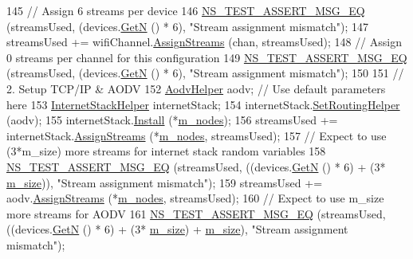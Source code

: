 \begin{DoxyCode}
145   \textcolor{comment}{// Assign 6 streams per device}
146   \hyperlink{group__testing_ga2a9d78cffb3db8e867c35fff0b698cf5}{NS\_TEST\_ASSERT\_MSG\_EQ} (streamsUsed, (devices.\hyperlink{classns3_1_1NetDeviceContainer_a74cafc212479bc38976bebd118e856b9}{GetN} () * 6), \textcolor{stringliteral}{"Stream assignment
       mismatch"});
147   streamsUsed += wifiChannel.\hyperlink{classns3_1_1YansWifiChannelHelper_ab409a15cfb8abb5195177625191e2584}{AssignStreams} (chan, streamsUsed);
148   \textcolor{comment}{// Assign 0 streams per channel for this configuration }
149   \hyperlink{group__testing_ga2a9d78cffb3db8e867c35fff0b698cf5}{NS\_TEST\_ASSERT\_MSG\_EQ} (streamsUsed, (devices.\hyperlink{classns3_1_1NetDeviceContainer_a74cafc212479bc38976bebd118e856b9}{GetN} () * 6), \textcolor{stringliteral}{"Stream assignment
       mismatch"});
150 
151   \textcolor{comment}{// 2. Setup TCP/IP & AODV}
152   \hyperlink{classns3_1_1AodvHelper}{AodvHelper} aodv; \textcolor{comment}{// Use default parameters here}
153   \hyperlink{classns3_1_1InternetStackHelper}{InternetStackHelper} internetStack;
154   internetStack.\hyperlink{classns3_1_1InternetStackHelper_a3e382c02df022dec79952a7eca8cd5ba}{SetRoutingHelper} (aodv);
155   internetStack.\hyperlink{classns3_1_1InternetStackHelper_a6645b412f31283d2d9bc3d8a95cebbc0}{Install} (*\hyperlink{classBug772ChainTest_a516c0c86192d926b8277fd3ed0e7f112}{m\_nodes});
156   streamsUsed += internetStack.\hyperlink{classns3_1_1InternetStackHelper_a63c904e832a2f17e036338db4aa2f1b8}{AssignStreams} (*\hyperlink{classBug772ChainTest_a516c0c86192d926b8277fd3ed0e7f112}{m\_nodes}, streamsUsed);
157   \textcolor{comment}{// Expect to use (3*m\_size) more streams for internet stack random variables}
158   \hyperlink{group__testing_ga2a9d78cffb3db8e867c35fff0b698cf5}{NS\_TEST\_ASSERT\_MSG\_EQ} (streamsUsed, ((devices.\hyperlink{classns3_1_1NetDeviceContainer_a74cafc212479bc38976bebd118e856b9}{GetN} () * 6) + (3*
      \hyperlink{classBug772ChainTest_a7204a38a0c781f1231601e4ee404c8d4}{m\_size})), \textcolor{stringliteral}{"Stream assignment mismatch"});
159   streamsUsed += aodv.\hyperlink{classns3_1_1AodvHelper_a478d356b61ddc4a3384bd50153113f74}{AssignStreams} (*\hyperlink{classBug772ChainTest_a516c0c86192d926b8277fd3ed0e7f112}{m\_nodes}, streamsUsed);
160   \textcolor{comment}{// Expect to use m\_size more streams for AODV}
161   \hyperlink{group__testing_ga2a9d78cffb3db8e867c35fff0b698cf5}{NS\_TEST\_ASSERT\_MSG\_EQ} (streamsUsed, ((devices.\hyperlink{classns3_1_1NetDeviceContainer_a74cafc212479bc38976bebd118e856b9}{GetN} () * 6) + (3*
      \hyperlink{classBug772ChainTest_a7204a38a0c781f1231601e4ee404c8d4}{m\_size}) + \hyperlink{classBug772ChainTest_a7204a38a0c781f1231601e4ee404c8d4}{m\_size}), \textcolor{stringliteral}{"Stream assignment mismatch"});

\end{DoxyCode}
